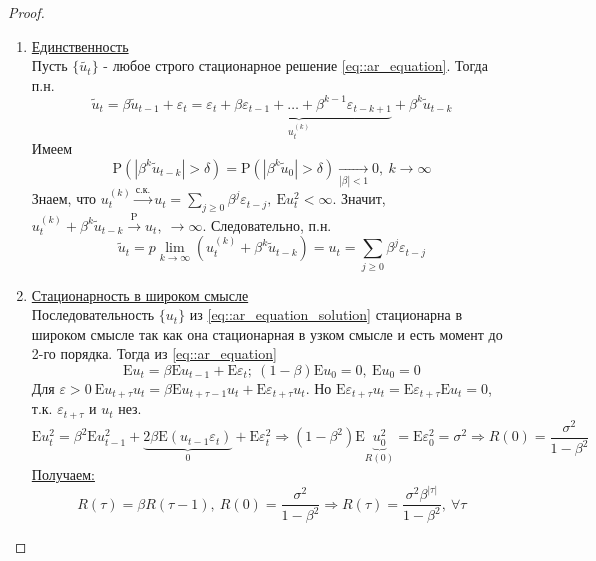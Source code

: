 \documentclass[12pt]{article}
\def\eps{ \varepsilon }
\def\E{ \mathrm{E} }
\def\P{ \mathrm{P} }
\begin{document}
\begin{proof}
\begin{enumerate}
        \item \underline{Единственность} \\
        Пусть $\{\widetilde{u_t}\}$ - любое строго стационарное решение \eqref{eq::ar_equation}.
        Тогда п.н.
        \[\widetilde{u}_t=\beta\widetilde{u}_{t-1}+\eps_t=\underbrace{\eps_t+\beta\eps_{t-1}+\ldots+\beta^{k-1}\eps_{t-k+1}}_{u_t^{(k)}}+\beta^k\widetilde{u}_{t-k}\]
        Имеем
        \[\P(\left\lvert \beta^k\widetilde{u}_{t-k}\right\rvert >\delta)=\P(\left\lvert \beta^k\widetilde{u}_0\right\rvert >\delta)\underset{\left\lvert \beta\right\rvert <1}{\rightarrow}0,\ k\rightarrow\infty\]
        Знаем, что $u_t^{(k)}\xrightarrow{\text{с.к.}}u_t=\sum_{j\geq0}\beta^j\eps_{t-j},\ \E u_t^2<\infty$.
        Значит, $u_t^{(k)}+\beta^k\widetilde{u}_{t-k}\xrightarrow{\P}u_t,\ \rightarrow\infty$.
        Следовательно, п.н.
        \[\widetilde{u}_t=p\lim_{k\rightarrow\infty}(u_t^{(k)}+\beta^k\widetilde{u}_{t-k})=u_t=\sum_{j\geq0}\beta^j\eps_{t-j}\]
        \item \underline{Стационарность в широком смысле} \\
        Последовательность $\{u_t\}$ из \eqref{eq::ar_equation_solution} стационарна в широком смысле
        так как она стационарная в узком смысле и есть момент до 2-го порядка.
        Тогда из \eqref{eq::ar_equation} 
        \[\E u_t=\beta\E u_{t-1}+\E\eps_t;\ (1-\beta)\E u_0=0,\ \E u_0=0\]
        Для $\eps>0\ \E u_{t+\tau}u_t=\beta\E u_{t+\tau-1}u_t+\E\eps_{t+\tau}u_t$. Но $\E\eps_{t+\tau}u_t=\E\eps_{t+\tau}\E u_t=0$, т.к. $\eps_{t+\tau}$ и $u_t$ нез.
        \[\E u_t^2=\beta^2\E u_{t-1}^2+\underbrace{2\beta\E(u_{t-1}\eps_t)}_0+\E\eps_t^2\Rightarrow
        (1-\beta^2)\E\underbrace{u_0^2}_{R(0)}=\E\eps_0^2=\sigma^2\Rightarrow R(0)=\frac{\sigma^2}{1-\beta^2}\]
        \underline{Получаем:} 
        \[R(\tau)=\beta R(\tau-1),\ R(0)=\frac{\sigma^2}{1-\beta^2}\Rightarrow R(\tau)=\frac{\sigma^2\beta^{\left\lvert \tau\right\rvert }}{1-\beta^2},\ \forall\tau\]
    \end{enumerate}
\end{proof}
\end{document}
